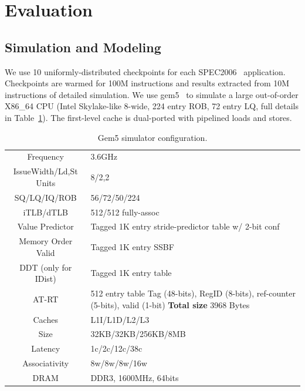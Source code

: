 \documentclass{sig-alternate}
\begin{document}
\section{Evaluation}
\label{sec:Results}

\subsection{Simulation and Modeling}
\label{sec:simulation}
We use 10 uniformly-distributed checkpoints for each SPEC2006~\cite{speccpu06} application. Checkpoints are warmed for 100M instructions and results extracted from 10M instructions of detailed simulation. We use gem5~\cite{gem5} to simulate a large out-of-order X86\_64 CPU (Intel Skylake-like 8-wide, 224 entry ROB, 72 entry LQ, full details in Table~\ref{table:cpu-specs}). The first-level cache is dual-ported with pipelined loads and stores. %

\begin{table}
	\begin{center}
	\begin{tabular} {|c|p{47mm}|}
    \hline
    Frequency & 3.6GHz \\
    IssueWidth/Ld,St Units  & 8/2,2 \\
    SQ/LQ/IQ/ROB & 56/72/50/224\\
    iTLB/dTLB & 512/512 fully-assoc\\
    \hline
    Value Predictor & Tagged 1K entry stride-predictor \newline table w/ 2-bit conf\\
    Memory Order Valid & Tagged 1K entry SSBF\\
    DDT (only for IDist) & Tagged 1K entry table\\
    \hline
    AT-RT & 512 entry table \newline
    Tag (48-bits), RegID (8-bits), \newline 
    ref-counter (5-bits), valid (1-bit)\newline 
    \textbf{Total size} 3968 Bytes\\
    \hline

    Caches & L1I/L1D/L2/L3 \\
    Size & 32KB/32KB/256KB/8MB \\
    Latency & 1c/2c/12c/38c \\
    Associativity & 8w/8w/8w/16w \\
    \hline
    DRAM & DDR3, 1600MHz, 64bits \\
    \hline
	\end{tabular}
    \end{center}
  \caption{Gem5 simulator configuration.}
  \label{table:cpu-specs}
\end{table}
\end{document}
